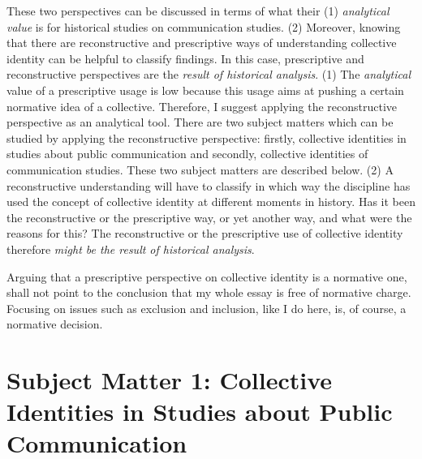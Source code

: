 \documentclass{tufte-handout}
\begin{document}
These two perspectives can be discussed in terms of what their (1)
\emph{analytical value} is for historical studies on communication
studies. (2) Moreover, knowing that there are reconstructive and
prescriptive ways of understanding collective identity can be helpful to
classify findings. In this case, prescriptive and reconstructive
perspectives are the \emph{result of historical analysis}. (1) The
\emph{analytical} value of a prescriptive usage is low because this
usage aims at pushing a certain normative idea of a collective.
Therefore, I suggest applying the reconstructive perspective as an
analytical tool. There are two subject matters which can be studied by
applying the reconstructive perspective: firstly, collective identities
in studies about public communication and secondly, collective
identities of communication studies. These two subject matters are
described below. (2) A reconstructive understanding will have to
classify in which way the discipline has used the concept of collective
identity at different moments in history. Has it been the reconstructive
or the prescriptive way, or yet another way, and what were the reasons
for this? The reconstructive or the prescriptive use of collective
identity therefore \emph{might be the result of historical analysis}.

Arguing that a prescriptive perspective on collective identity is a
normative one, shall not point to the conclusion that my whole essay is
free of normative charge. Focusing on issues such as exclusion and
inclusion, like I do here, is, of course, a normative decision.

\hypertarget{subject-matter-1-collective-identities-in-studies-about-public-communication}{%
\section{Subject Matter 1: Collective Identities in Studies about
Public\\\noindent Communication}\label{subject-matter-1-collective-identities-in-studies-about-public-communication}}
\end{document}
